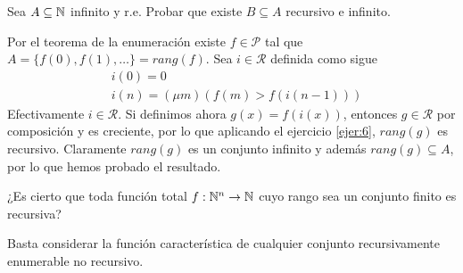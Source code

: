 \documentclass[twoside]{article}
\begin{document}
\newpage

\begin{ejercicio}{8}
Sea $A \subseteq \mathbb{N}$ infinito y r.e. Probar que existe $B \subseteq A$ recursivo e infinito.
\end{ejercicio}
\begin{solucion}
Por el teorema de la enumeración existe $f\in\mathcal{P}$ tal que $A=\{f(0),f(1),\dots\}=rang(f)$. Sea $i\in\mathcal{R}$ definida como sigue
\begin{align*}
&i(0)=0\\
&i(n)=(\mu m)(f(m)> f(i(n-1)))
\end{align*}
Efectivamente $i\in\mathcal{R}$. Si definimos ahora $g(x)=f(i(x))$, entonces $g\in\mathcal{R}$ por composición y es creciente, por lo que aplicando el ejercicio \ref{ejer:6}, $rang(g)$ es recursivo. Claramente $rang(g)$ es un conjunto infinito y además $rang(g)\subseteq A$, por lo que hemos probado el resultado.
\end{solucion}

\newpage

\begin{ejercicio}{11}
¿Es cierto que toda función total $f : \mathbb{N}^n \to \mathbb{N}$ cuyo rango sea un conjunto finito es
recursiva?
\end{ejercicio}
\begin{solucion}
Basta considerar la función característica de cualquier conjunto recursivamente enumerable no recursivo. 
\end{solucion}
\end{document}
